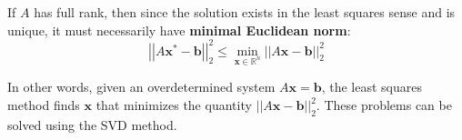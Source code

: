 \noindent
If $A$ has full rank, then since the solution exists in the least squares sense and is unique, it must necessarily have \textbf{minimal Euclidean norm}:
\begin{equation}
    {\left|\left|A \mathbf{x}^{*} - \mathbf{b}\right|\right|}_{2}^{2} \le \underset{\mathbf{x} \in \mathbb{R}^{n}}{\min} {\left|\left|A\mathbf{x} - \mathbf{b}\right|\right|}_{2}^{2}
\end{equation}

\highspace
In other words, given an overdetermined system $A\mathbf{x} = \mathbf{b}$, the least squares method finds $\mathbf{x}$ that minimizes the quantity ${\left|\left|A\mathbf{x} - \mathbf{b}\right|\right|}_{2}^{2}$. These problems can be solved using the SVD method.
